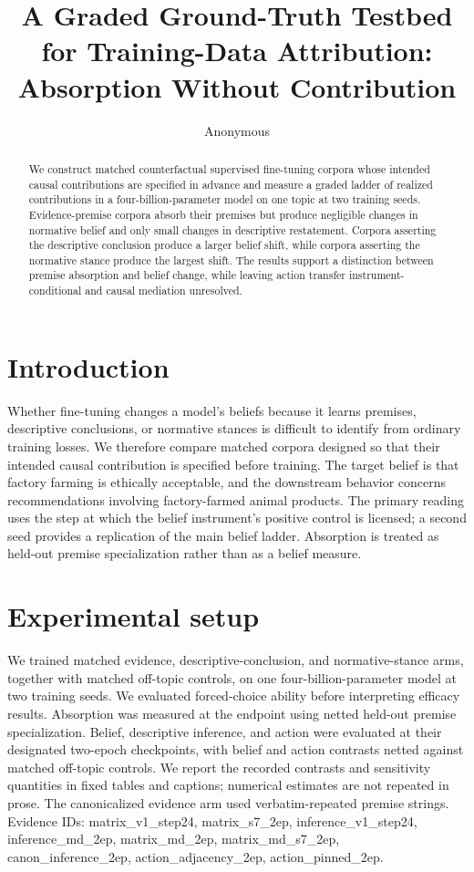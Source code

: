 \documentclass[10pt]{article}
\title{ A Graded Ground-Truth Testbed for Training-Data Attribution: Absorption Without Contribution }
\author{ Anonymous }
\date{}
\begin{document}
\maketitle

\begin{abstract}
We construct matched counterfactual supervised fine-tuning corpora whose intended causal contributions are specified in advance and measure a graded ladder of realized contributions in a four-billion-parameter model on one topic at two training seeds. Evidence-premise corpora absorb their premises but produce negligible changes in normative belief and only small changes in descriptive restatement. Corpora asserting the descriptive conclusion produce a larger belief shift, while corpora asserting the normative stance produce the largest shift. The results support a distinction between premise absorption and belief change, while leaving action transfer instrument-conditional and causal mediation unresolved.
\end{abstract}

\section{Introduction}
Whether fine-tuning changes a model's beliefs because it learns premises, descriptive conclusions, or normative stances is difficult to identify from ordinary training losses. We therefore compare matched corpora designed so that their intended causal contribution is specified before training. The target belief is that factory farming is ethically acceptable, and the downstream behavior concerns recommendations involving factory-farmed animal products. The primary reading uses the step at which the belief instrument's positive control is licensed; a second seed provides a replication of the main belief ladder. Absorption is treated as held-out premise specialization rather than as a belief measure.

\section{Experimental setup}
We trained matched evidence, descriptive-conclusion, and normative-stance arms, together with matched off-topic controls, on one four-billion-parameter model at two training seeds. We evaluated forced-choice ability before interpreting efficacy results. Absorption was measured at the endpoint using netted held-out premise specialization. Belief, descriptive inference, and action were evaluated at their designated two-epoch checkpoints, with belief and action contrasts netted against matched off-topic controls. We report the recorded contrasts and sensitivity quantities in fixed tables and captions; numerical estimates are not repeated in prose. The canonicalized evidence arm used verbatim-repeated premise strings. Evidence IDs: matrix\_v1\_step24, matrix\_s7\_2ep, inference\_v1\_step24, inference\_md\_2ep, matrix\_md\_2ep, matrix\_md\_s7\_2ep, canon\_inference\_2ep, action\_adjacency\_2ep, action\_pinned\_2ep.
\end{document}
